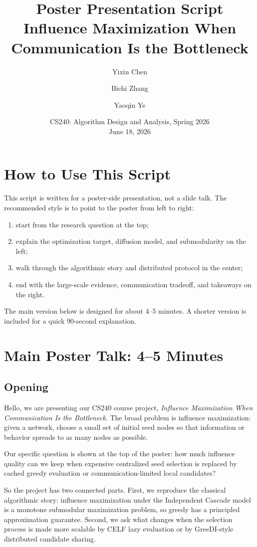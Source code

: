 \documentclass[10pt]{article}
\title{\textbf{Poster Presentation Script}\\
Influence Maximization When Communication Is the Bottleneck}
\author{Yixin Chen \and Bichi Zhang \and Yaoqin Ye}
\date{CS240: Algorithm Design and Analysis, Spring 2026\\June 18, 2026}
\begin{document}
\maketitle

\section*{How to Use This Script}

This script is written for a poster-side presentation, not a slide talk. The
recommended style is to point to the poster from left to right:
\begin{enumerate}
  \item start from the research question at the top;
  \item explain the optimization target, diffusion model, and submodularity on
  the left;
  \item walk through the algorithmic story and distributed protocol in the
  center;
  \item end with the large-scale evidence, communication tradeoff, and
  takeaways on the right.
\end{enumerate}

The main version below is designed for about 4--5 minutes. A shorter version is
included for a quick 90-second explanation.

\section{Main Poster Talk: 4--5 Minutes}

\subsection*{Opening}

Hello, we are presenting our CS240 course project, \emph{Influence Maximization
When Communication Is the Bottleneck}. The broad problem is influence
maximization: given a network, choose a small set of initial seed nodes so that
information or behavior spreads to as many nodes as possible.

Our specific question is shown at the top of the poster: how much influence
quality can we keep when expensive centralized seed selection is replaced by
cached greedy evaluation or communication-limited local candidates?

So the project has two connected parts. First, we reproduce the classical
algorithmic story: influence maximization under the Independent Cascade model
is a monotone submodular maximization problem, so greedy has a principled
approximation guarantee. Second, we ask what changes when the selection process
is made more scalable by CELF lazy evaluation or by GreeDI-style distributed
candidate sharing.
\end{document}
